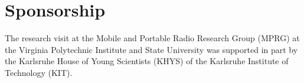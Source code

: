 \chapter*{Sponsorship}

The research visit at the Mobile and Portable Radio Research Group (MPRG) at the Virginia Polytechnic Institute and State University was supported in part by the Karlsruhe House of Young Scientists (KHYS) of the Karlsruhe Institute of Technology (KIT).